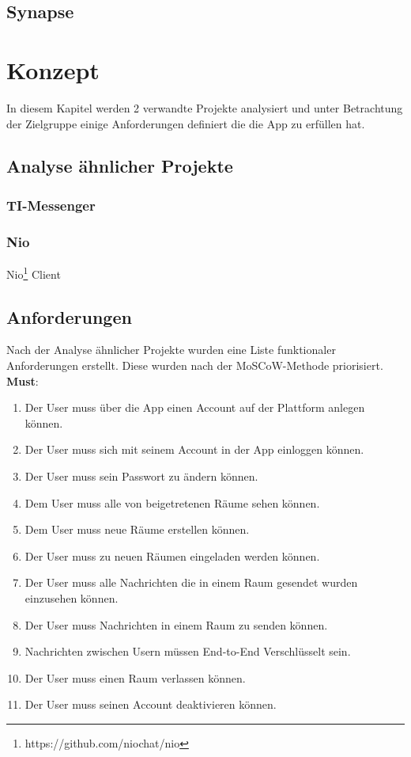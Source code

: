     \section{Synapse}\label{sec:synapse}

    \chapter{Konzept}\label{ch:konzept}
    In diesem Kapitel werden 2 verwandte Projekte analysiert und unter Betrachtung der Zielgruppe einige Anforderungen definiert die die App zu erfüllen hat.

    \section{Analyse ähnlicher Projekte}\label{sec:analyse-ahnlicher-projekte}

    \subsection{TI-Messenger}


    \subsection{Nio}
    Nio\footnote{https://github.com/niochat/nio} Client



    \newpage
    \section{Anforderungen}\label{sec:anforderungen}
    Nach der Analyse ähnlicher Projekte wurden eine Liste funktionaler Anforderungen erstellt.
    Diese wurden nach der MoSCoW-Methode priorisiert.\\

    \textbf{Must}:
    \begin{enumerate}[label={\roman*.}, leftmargin=2.5cm]
        \item Der User muss über die App einen Account auf der Plattform anlegen können.
        \item Der User muss sich mit seinem Account in der App einloggen können.
        \item Der User muss sein Passwort zu ändern können.
        \item Dem User muss alle von beigetretenen Räume sehen können.
        \item Dem User muss neue Räume erstellen können.
        \item Der User muss zu neuen Räumen eingeladen werden können.
        \item Der User muss alle Nachrichten die in einem Raum gesendet wurden einzusehen können.
        \item Der User muss Nachrichten in einem Raum zu senden können.
        \item Nachrichten zwischen Usern müssen End-to-End Verschlüsselt sein.
        \item Der User muss einen Raum verlassen können.
        \item Der User muss seinen Account deaktivieren können.
    \end{enumerate}


